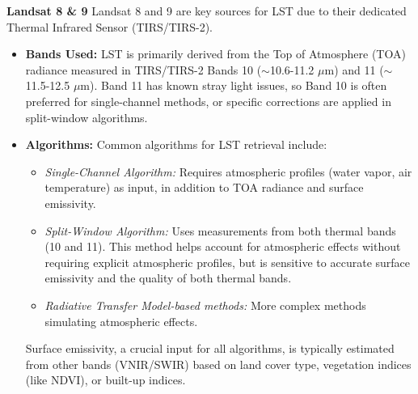 \documentclass{article}
\begin{document}
\noindent \textbf{Landsat 8 \& 9}
\newline
Landsat 8 and 9 are key sources for LST due to their dedicated Thermal Infrared Sensor (TIRS/TIRS-2)\cite{landsatUSGS}.
\begin{itemize}
    \item \textbf{Bands Used:} LST is primarily derived from the Top of Atmosphere (TOA) radiance measured in TIRS/TIRS-2 Bands 10 ($\sim$10.6-11.2 $\mu$m) and 11 ($\sim$11.5-12.5 $\mu$m)\cite{landsatUSGS}. Band 11 has known stray light issues, so Band 10 is often preferred for single-channel methods, or specific corrections are applied in split-window algorithms.
    \item \textbf{Algorithms:} Common algorithms for LST retrieval include:
    \begin{itemize}
        \item \textit{Single-Channel Algorithm:} Requires atmospheric profiles (water vapor, air temperature) as input, in addition to TOA radiance and surface emissivity\cite{landsatLST}.
        \item \textit{Split-Window Algorithm:} Uses measurements from both thermal bands (10 and 11). This method helps account for atmospheric effects without requiring explicit atmospheric profiles, but is sensitive to accurate surface emissivity and the quality of both thermal bands\cite{landsatLST}.
        \item \textit{Radiative Transfer Model-based methods:} More complex methods simulating atmospheric effects.
    \end{itemize}
    Surface emissivity, a crucial input for all algorithms, is typically estimated from other bands (VNIR/SWIR) based on land cover type, vegetation indices (like NDVI), or built-up indices\cite{landsatLST}.
\end{itemize}

\vspace{1em}
\end{document}
